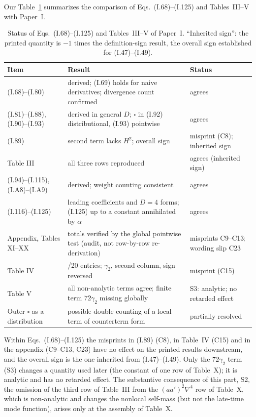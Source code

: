 \documentclass[aps,prd,onecolumn,10pt,nofootinbib,floatfix]{revtex4-2}
\newcommand{\PI}{Paper~I}
\newcommand{\eqI}[1]{(I.#1)}
\begin{document}
Our Table~\ref{tab:s4b:summary} summarizes the comparison of Eqs.~\eqI{68}--\eqI{125} and Tables~III--V with \PI.

\begin{table}[tb]
\caption{Status of Eqs.~\eqI{68}--\eqI{125} and Tables~III--V of \PI. ``Inherited sign'': the printed quantity is $-1$
times the definition-sign result, the overall sign established for \eqI{47}--\eqI{49}.}
\label{tab:s4b:summary}
\renewcommand{\arraystretch}{1.25}
\begin{ruledtabular}
\begin{tabular}{@{}>{\raggedright\arraybackslash}p{}>{\raggedright\arraybackslash}p{}%
>{\raggedright\arraybackslash}p{}@{}}
Item & Result & Status\\
\hline
\eqI{68}--\eqI{80} & derived; \eqI{69} holds for naive derivatives; divergence count confirmed & agrees\\
\eqI{81}--\eqI{88}, \eqI{90}--\eqI{93} & derived in general $D$; $\square$ in \eqI{92} distributional, \eqI{93} pointwise & agrees\\
\eqI{89} & second term lacks $H^2$; overall sign & misprint (C8); inherited sign\\
Table III & all three rows reproduced & agrees (inherited sign)\\
\eqI{94}--\eqI{115}, \eqI{A8}--\eqI{A9} & derived; weight counting consistent & agrees\\
\eqI{116}--\eqI{125} & leading coefficients and $D=4$ forms; \eqI{125} up to a constant annihilated by $\alpha$ & agrees\\
Appendix, Tables XI--XX & totals verified by the global pointwise test (audit, not row-by-row re-derivation) & misprints C9--C13; wording slip C23\\
Table IV & 19/20 entries; $\gamma_2$, second column, sign reversed & misprint (C15)\\
Table V & all non-analytic terms agree; finite term $72\gamma_2$ missing globally & S3: analytic; no retarded effect\\
Outer $\square$ as a distribution & possible double counting of a local term of counterterm form & partially resolved\\
\end{tabular}
\end{ruledtabular}
\end{table}

Within Eqs.~\eqI{68}--\eqI{125} the misprints in \eqI{89} (C8), in Table~IV (C15) and in the appendix (C9--C13, C23) have no effect on the
printed results downstream, and the overall sign is the one inherited from \eqI{47}--\eqI{49}. Only the $72\gamma_2$
term (S3) changes a quantity used later (the constant of one row of Table~X); it is analytic and has no retarded effect.
The substantive consequence of this part, S2, the omission of the third row of Table~III from the $(aa')^2\nabla^4$ row
of Table~X, which is non-analytic and changes the nonlocal self-mass (but not the late-time mode function), arises
only at the assembly of Table~X.
\end{document}
